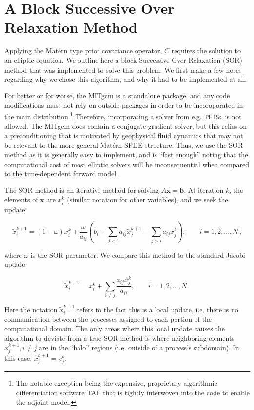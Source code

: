 \section{A Block Successive Over Relaxation Method}
\label{sec:block_sor}

Applying the Mat\'ern type prior covariance operator, $C$
requires the solution to an elliptic equation.
We outline here a block-Successive Over Relaxation (SOR) method that was
implemented to solve this problem.
We first make a few notes regarding why we chose this algorithm, and why it had
to be implemented at all.

For better or for worse, the MITgcm is a standalone package, and any code
modifications must not rely on outside packages in order to be incoroporated in
the main distribution.\footnote{The notable exception being the expensive,
    proprietary algorithmic differentiation software TAF \citep{giering2005}
    that is tightly interwoven into the code to enable the adjoint model.}
Therefore, incorporating a solver from e.g.\ \texttt{PETSc} is not allowed.
The MITgcm does contain a conjugate gradient solver, but this relies on
a preconditioning that is motivated by geophysical fluid dynamics that may not
be relevant to the more general Mat\'ern SPDE structure.
Thus, we use the SOR method as it is generally easy to implement, and is ``fast
enough'' noting that the computational cost of most elliptic solvers will be
inconsequential when compared to the time-dependent forward model.

The SOR method is an iterative method for solving $A\mathbf{x} = \mathbf{b}$.
At iteration $k$, the elements of $\mathbf{x}$ are $x_i^k$ (similar
notation for other variables), and we seek the update:
\begin{linenomath}\begin{equation}
    \tilde{x}_i^{k+1} = (1-\omega) x_i^k + \dfrac{\omega}{a_{ii}}
    \left( b_i - \sum_{j<i}a_{ij}\tilde{x}_j^{k+1} -
        \sum_{j>i}a_{ij}x_j^{k}\right), \qquad
        i=1,2,...,N \, ,
    \label{eq:sor_update}
\end{equation}\end{linenomath}
where $\omega$ is the SOR parameter.
We compare this method to the standard Jacobi update
\begin{linenomath*}\begin{equation*}
    \tilde{x}_i^{k+1} = x_i^k + \sum_{i\ne j}\dfrac{a_{ij}x_j^k}{a_{ii}},
    \qquad i=1,2,...,N \, .
\end{equation*}\end{linenomath*}
Here the notation $\tilde{x}_i^{k+1}$ refers to the fact this is a local update,
i.e. there is no communication between the processes assigned to each portion of
the computational domain.
The only areas where this local update causes the algorithm to deviate from a
true SOR method is where neighboring elements
$\tilde{x}^{k+1}_{j}, i\ne j$ are in the ``halo'' regions (i.e. outside of a
process's subdomain).
In this case, $\tilde{x}^{k+1}_j = x^k_j$.

